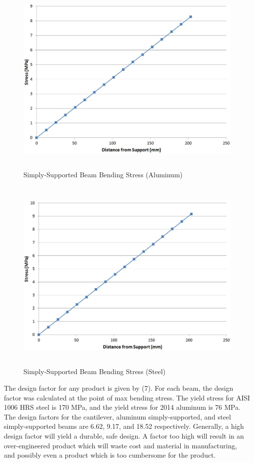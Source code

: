 \documentclass[12pt]{article}
\begin{document}
\begin{figure}[h!]  
  \centering
    \includegraphics[width=\linewidth, height=3.8in]{simp_support_a_stress_vs_distance.JPG}
    \caption{Simply-Supported Beam Bending Stress (Aluminum)} 
\end{figure}

\bigskip

\begin{figure}[h!]  
  \centering
    \includegraphics[width=\linewidth, height=3.8in]{simp_support_s_stress_vs_distance.JPG}
    \caption{Simply-Supported Beam Bending Stress (Steel)} 
\end{figure}


\newpage

The design factor for any product is given by (7). For each beam, the design factor was calculated at the point of max bending stress. The yield stress for AISI 1006 HRS steel is 170 MPa, and the yield stress for 2014 aluminum is 76 MPa. The design factors for the cantilever, aluminum simply-supported, and steel simply-supported beams are 6.62, 9.17, and 18.52 respectively. Generally, a high design factor will yield a durable, safe design. A factor too high will result in an over-engineered product which will waste cost and material in manufacturing, and possibly even a product which is too cumbersome for the product.
\bigskip
\end{document}
